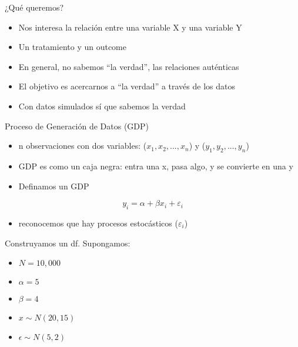 \documentclass[
  ignorenonframetext,
]{beamer}
\providecommand{\tightlist}{%
  \setlength{\itemsep}{0pt}\setlength{\parskip}{0pt}}
\begin{document}
\begin{frame}{¿Qué queremos?}
\protect\hypertarget{quuxe9-queremos}{}
\begin{itemize}
\item
  Nos interesa la relación entre una variable X y una variable Y
\item
  Un tratamiento y un outcome
\item
  En general, no sabemos ``la verdad'', las relaciones auténticas
\item
  El objetivo es acercarnos a ``la verdad'' a través de los datos
\item
  Con datos simulados sí que sabemos la verdad
\end{itemize}
\end{frame}

\begin{frame}{Proceso de Generación de Datos (GDP)}
\protect\hypertarget{proceso-de-generaciuxf3n-de-datos-gdp}{}
\begin{itemize}
\item
  n observaciones con dos variables: (\(x_1, x_2 , ..., x_n\)) y
  (\(y_1, y_2, ..., y_n\))
\item
  GDP es como un caja negra: entra una x, pasa algo, y se convierte en
  una y
\item
  Definamos un GDP
\end{itemize}

\[ y_i=\alpha + \beta x_i + \varepsilon_i \]

\begin{itemize}
\tightlist
\item
  reconocemos que hay procesos estocásticos (\(\varepsilon_i\))
\end{itemize}
\end{frame}

\begin{frame}{}
\protect\hypertarget{section}{}
Construyamos un df. Supongamos:

\begin{itemize}
\tightlist
\item
  \(N=10,000\)
\item
  \(\alpha = 5\)
\item
  \(\beta= 4\)
\item
  \(x \sim N(20, 15)\)
\item
  \(\epsilon \sim N(5,2)\)
\end{itemize}
\end{frame}
\end{document}
